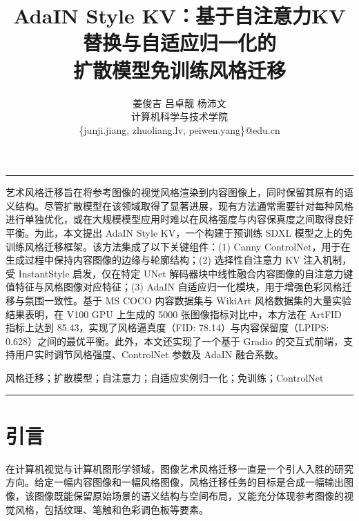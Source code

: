 \documentclass[twocolumn,a4paper,11pt]{ctexart}
\begin{document}
\title{\vspace{-0.8cm}\LARGE\bfseries AdaIN Style KV：基于自注意力KV替换与自适应归一化的\\扩散模型免训练风格迁移}
\author{姜俊吉 \quad 吕卓靓 \quad 杨沛文\\[3pt]
\small 计算机科学与技术学院\\[2pt]
\small \{junji.jiang, zhuoliang.lv, peiwen.yang\}@edu.cn}
\date{}
\maketitle

\begin{center}
\rule{\columnwidth}{0.4pt}
\end{center}

艺术风格迁移旨在将参考图像的视觉风格渲染到内容图像上，同时保留其原有的语义结构。尽管扩散模型在该领域取得了显著进展，现有方法通常需要针对每种风格进行单独优化，或在大规模模型应用时难以在风格强度与内容保真度之间取得良好平衡。为此，本文提出 AdaIN Style KV，一个构建于预训练 SDXL 模型之上的免训练风格迁移框架。该方法集成了以下关键组件：(1) Canny ControlNet，用于在生成过程中保持内容图像的边缘与轮廓结构；(2) 选择性自注意力 KV 注入机制，受 InstantStyle 启发，仅在特定 UNet 解码器块中线性融合内容图像的自注意力键值特征与风格图像对应特征；(3) AdaIN 自适应归一化模块，用于增强色彩风格迁移与氛围一致性。基于 MS COCO 内容数据集与 WikiArt 风格数据集的大量实验结果表明，在 V100 GPU 上生成的 5000 张图像指标对比中，本方法在 ArtFID 指标上达到 85.43，实现了风格逼真度（FID: 78.14）与内容保留度（LPIPS: 0.628）之间的最优平衡。此外，本文还实现了一个基于 Gradio 的交互式前端，支持用户实时调节风格强度、ControlNet 参数及 AdaIN 融合系数。

风格迁移；扩散模型；自注意力；自适应实例归一化；免训练；ControlNet

\begin{center}
\rule{\columnwidth}{0.4pt}
\end{center}

\section{引言}

在计算机视觉与计算机图形学领域，图像艺术风格迁移一直是一个引人入胜的研究方向。给定一幅内容图像和一幅风格图像，风格迁移任务的目标是合成一幅输出图像，该图像既能保留原始场景的语义结构与空间布局，又能充分体现参考图像的视觉风格，包括纹理、笔触和色彩调色板等要素。
\end{document}
